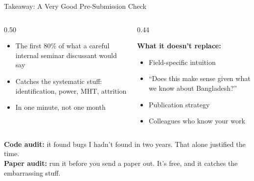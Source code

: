 \documentclass[aspectratio=169, 10pt]{beamer}
\begin{document}
\begin{frame}{Takeaway: A Very Good Pre-Submission Check}
\begin{columns}[T]
\begin{column}{0.50\textwidth}
\begin{tcolorbox}[keybox, title={\faCheck\quad What It Replaces}]
\small
\begin{itemize}\setlength{\itemsep}{3pt}
  \item The first 80\% of what a careful internal seminar discussant would say
  \item Catches the systematic stuff: identification, power, MHT, attrition
  \item In one minute, not one month
\end{itemize}
\end{tcolorbox}
\end{column}
\begin{column}{0.44\textwidth}
\begin{tcolorbox}[colback=SoftCoral!8, colframe=SoftCoral, boxrule=0.5pt, arc=3pt,
  left=6pt, right=6pt, top=4pt, bottom=4pt]
\small
\textbf{What it doesn't replace:}
\vskip3pt
\begin{itemize}\setlength{\itemsep}{2pt}
  \item Field-specific intuition
  \item ``Does this make sense given what we know about Bangladesh?''
  \item Publication strategy
  \item Colleagues who know your work
\end{itemize}
\end{tcolorbox}
\end{column}
\end{columns}
\vskip8pt
\begin{tcolorbox}[quotebox, width=13cm]
\small \textbf{Code audit:} it found bugs I hadn't found in two years. That alone justified the time.\\[2pt]
\textbf{Paper audit:} run it before you send a paper out. It's free, and it catches the embarrassing stuff.
\end{tcolorbox}
\end{frame}
\end{document}
